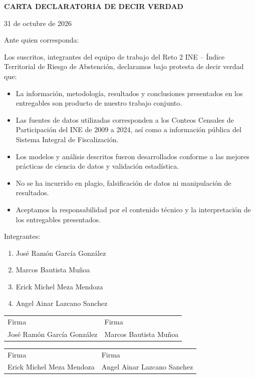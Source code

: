 \documentclass[12pt,a4paper]{article}
\begin{document}
\begin{center}
{\large \textbf{CARTA DECLARATORIA DE DECIR VERDAD}}
\end{center}

\vspace{1cm}

31 de octubre de 2026

Ante quien corresponda:

Los suscritos, integrantes del equipo de trabajo del Reto 2 INE -- Índice Territorial de Riesgo de Abstención, declaramos bajo protesta de decir verdad que:

\begin{itemize}
\item La información, metodología, resultados y conclusiones presentados en los entregables son producto de nuestro trabajo conjunto.
\item Las fuentes de datos utilizadas corresponden a los Conteos Censales de Participación del INE de 2009 a 2024, así como a información pública del Sistema Integral de Fiscalización.
\item Los modelos y análisis descritos fueron desarrollados conforme a las mejores prácticas de ciencia de datos y validación estadística.
\item No se ha incurrido en plagio, falsificación de datos ni manipulación de resultados.
\item Aceptamos la responsabilidad por el contenido técnico y la interpretación de los entregables presentados.
\end{itemize}

Integrantes:

\begin{enumerate}
\item José Ramón García González
\item Marcos Bautista Muñoa
\item Erick Michel Meza Mendoza
\item Angel Ainar Lazcano Sanchez
\end{enumerate}

\vspace{3cm}

\begin{center}
\begin{tabular}{p{6cm}p{6cm}}
\hline
Firma & Firma \\
José Ramón García González & Marcos Bautista Muñoa \\
\hline
\end{tabular}

\vspace{1cm}

\begin{tabular}{p{6cm}p{6cm}}
\hline
Firma & Firma \\
Erick Michel Meza Mendoza & Angel Ainar Lazcano Sanchez \\
\hline
\end{tabular}
\end{center}
\end{document}
